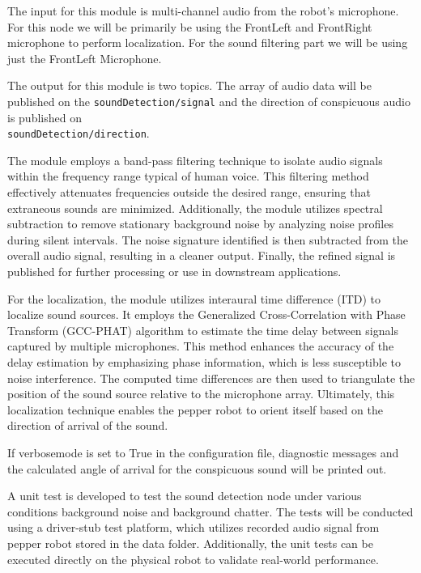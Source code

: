 \documentclass{CSSRforAfrica}
\begin{document}
The input for this module is multi-channel audio from the robot's microphone. For this node we will be primarily be using the FrontLeft and FrontRight microphone to perform localization. For the sound filtering part we will be using just the FrontLeft Microphone.

The output for this module is two topics. The array of audio data will be published on the \texttt{soundDetection/signal} and the direction of conspicuous audio is published on \\ \texttt{soundDetection/direction}.

The module employs a band-pass filtering technique to isolate audio signals within the frequency range typical of human voice. This filtering method effectively attenuates frequencies outside the desired range, ensuring that extraneous sounds are minimized. Additionally, the module utilizes spectral subtraction to remove stationary background noise by analyzing noise profiles during silent intervals. The noise signature identified is then subtracted from the overall audio signal, resulting in a cleaner output. Finally, the refined signal is published for further processing or use in downstream applications.

For the localization, the module utilizes interaural time difference (ITD) to localize sound sources. It employs the Generalized Cross-Correlation with Phase Transform (GCC-PHAT) algorithm to estimate the time delay between signals captured by multiple microphones. This method enhances the accuracy of the delay estimation by emphasizing phase information, which is less susceptible to noise interference. The computed time differences are then used to triangulate the position of the sound source relative to the microphone array. Ultimately, this localization technique enables the pepper robot to orient itself based on the  direction of arrival of the sound.

If verbosemode is set to True in the configuration file, diagnostic messages and the calculated angle of arrival for the conspicuous sound will be printed out. 

A unit test is developed to test the sound detection node under various conditions background noise and background chatter. The tests will be conducted using a driver-stub test platform, which utilizes recorded audio signal from pepper robot stored in the data folder. Additionally, the unit tests can be executed directly on the physical robot to validate real-world performance.

\newpage
\end{document}
